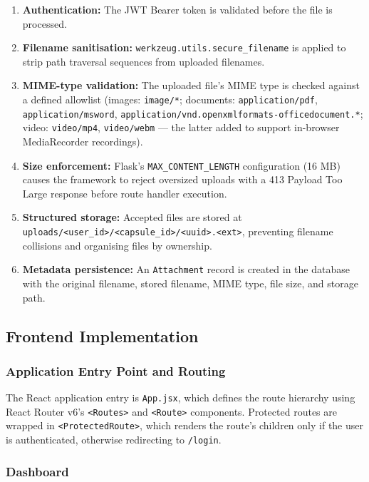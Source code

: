\documentclass[12pt, a4paper]{article}
\begin{document}
\begin{enumerate}
  \item \textbf{Authentication:} The JWT Bearer token is validated before the file is processed.
  \item \textbf{Filename sanitisation:} \texttt{werkzeug.utils.secure\_filename} is applied to strip path traversal sequences from uploaded filenames.
  \item \textbf{MIME-type validation:} The uploaded file's MIME type is checked against a defined allowlist (images: \texttt{image/*}; documents: \texttt{application/pdf}, \texttt{application/msword}, \texttt{application/vnd.openxmlformats-officedocument.*}; video: \texttt{video/mp4}, \texttt{video/webm} — the latter added to support in-browser MediaRecorder recordings).
  \item \textbf{Size enforcement:} Flask's \texttt{MAX\_CONTENT\_LENGTH} configuration (16 MB) causes the framework to reject oversized uploads with a 413 Payload Too Large response before route handler execution.
  \item \textbf{Structured storage:} Accepted files are stored at \texttt{uploads/<user\_id>/<capsule\_id>/<uuid>.<ext>}, preventing filename collisions and organising files by ownership.
  \item \textbf{Metadata persistence:} An \texttt{Attachment} record is created in the database with the original filename, stored filename, MIME type, file size, and storage path.
\end{enumerate}

\subsection{Frontend Implementation}

\subsubsection{Application Entry Point and Routing}

The React application entry is \texttt{App.jsx}, which defines the route hierarchy using React Router v6's \texttt{<Routes>} and \texttt{<Route>} components. Protected routes are wrapped in \texttt{<ProtectedRoute>}, which renders the route's children only if the user is authenticated, otherwise redirecting to \texttt{/login}.

\subsubsection{Dashboard}
\end{document}

